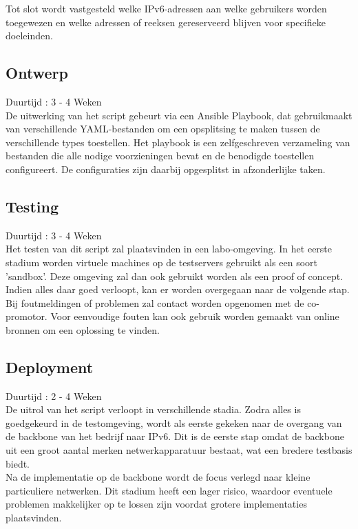 Tot slot wordt vastgesteld welke IPv6-adressen aan welke gebruikers worden toegewezen en welke adressen of reeksen gereserveerd blijven voor specifieke doeleinden.

\subsection{Ontwerp}
\label{sec:ontwerp}
{\small Duurtijd : 3 - 4 Weken}\\

De uitwerking van het script gebeurt via een Ansible Playbook, dat gebruikmaakt van verschillende YAML-bestanden om een opsplitsing te maken tussen de verschillende types toestellen.
Het playbook is een zelfgeschreven verzameling van bestanden die alle nodige voorzieningen bevat en de benodigde toestellen configureert. De configuraties zijn daarbij opgesplitst in afzonderlijke taken.

\subsection{Testing}
\label{sec:testing}
{\small Duurtijd : 3 - 4 Weken}\\

Het testen van dit script zal plaatsvinden in een labo-omgeving. In het eerste stadium worden virtuele machines op de testservers gebruikt als een soort 'sandbox'.
Deze omgeving zal dan ook gebruikt worden als een proof of concept.
Indien alles daar goed verloopt, kan er worden overgegaan naar de volgende stap.
Bij foutmeldingen of problemen zal contact worden opgenomen met de co-promotor. Voor eenvoudige fouten kan ook gebruik worden gemaakt van online bronnen om een oplossing te vinden.

\subsection{Deployment}
\label{sec:deployment}
{\small Duurtijd : 2 - 4 Weken}\\

De uitrol van het script verloopt in verschillende stadia. 
Zodra alles is goedgekeurd in de testomgeving, wordt als eerste gekeken naar de overgang van de backbone van het bedrijf naar IPv6.
Dit is de eerste stap omdat de backbone uit een groot aantal merken netwerkapparatuur bestaat, wat een bredere testbasis biedt.\\

Na de implementatie op de backbone wordt de focus verlegd naar kleine particuliere netwerken. 
Dit stadium heeft een lager risico, waardoor eventuele problemen makkelijker op te lossen zijn voordat grotere implementaties plaatsvinden.\\

